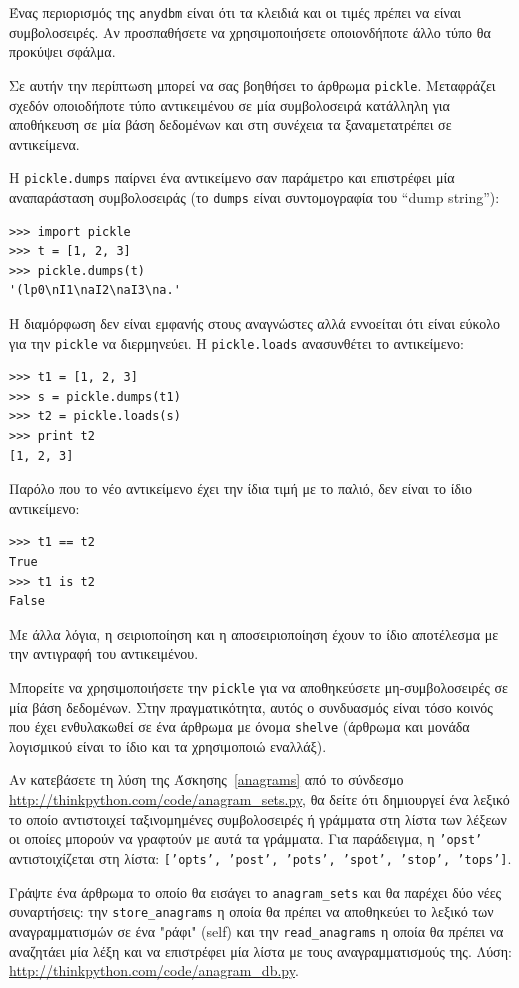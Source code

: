 \documentclass[10pt]{book}
\begin{document}
Ένας περιορισμός της {\tt anydbm} είναι ότι τα κλειδιά και οι τιμές πρέπει να είναι συμβολοσειρές. Αν προσπαθήσετε να χρησιμοποιήσετε οποιονδήποτε άλλο τύπο θα προκύψει σφάλμα.

Σε αυτήν την περίπτωση μπορεί να σας βοηθήσει το άρθρωμα  {\tt pickle}.  Μεταφράζει σχεδόν οποιοδήποτε τύπο αντικειμένου σε μία συμβολοσειρά κατάλληλη για αποθήκευση σε μία βάση δεδομένων και στη συνέχεια τα 
ξαναμετατρέπει σε αντικείμενα.

Η {\tt pickle.dumps} παίρνει ένα αντικείμενο σαν παράμετρο και επιστρέφει μία αναπαράσταση συμβολοσειράς
(το {\tt dumps} είναι συντομογραφία του ``dump string''):

\begin{verbatim}
>>> import pickle
>>> t = [1, 2, 3]
>>> pickle.dumps(t)
'(lp0\nI1\naI2\naI3\na.'
\end{verbatim}
%
Η διαμόρφωση δεν είναι εμφανής στους αναγνώστες αλλά εννοείται ότι είναι εύκολο για την {\tt pickle} να διερμηνεύει. 
Η {\tt pickle.loads} ανασυνθέτει το αντικείμενο:

\begin{verbatim}
>>> t1 = [1, 2, 3]
>>> s = pickle.dumps(t1)
>>> t2 = pickle.loads(s)
>>> print t2
[1, 2, 3]
\end{verbatim}
%
Παρόλο που το νέο αντικείμενο έχει την ίδια τιμή με το παλιό, δεν είναι το ίδιο αντικείμενο:

\begin{verbatim}
>>> t1 == t2
True
>>> t1 is t2
False
\end{verbatim}
%
Με άλλα λόγια, η σειριοποίηση και η αποσειριοποίηση έχουν το ίδιο αποτέλεσμα με την αντιγραφή του αντικειμένου.

Μπορείτε να χρησιμοποιήσετε την {\tt pickle} για να αποθηκεύσετε μη-συμβολοσειρές σε μία βάση δεδομένων. 
Στην πραγματικότητα, αυτός ο συνδυασμός είναι τόσο κοινός που έχει ενθυλακωθεί σε ένα άρθρωμα με όνομα {\tt shelve}
(άρθρωμα και μονάδα λογισμικού είναι το ίδιο και τα χρησιμοποιώ εναλλάξ).
\\


\begin{exercise}

Αν κατεβάσετε τη λύση της Άσκησης~\ref{anagrams} από το σύνδεσμο \url{http://thinkpython.com/code/anagram_sets.py}, θα δείτε ότι δημιουργεί ένα λεξικό το οποίο αντιστοιχεί ταξινομημένες συμβολοσειρές ή γράμματα στη λίστα των λέξεων οι οποίες μπορούν να γραφτούν με αυτά τα γράμματα. Για παράδειγμα, η {\tt 'opst'} αντιστοιχίζεται στη λίστα: {\tt ['opts', 'post', 'pots', 'spot', 'stop', 'tops']}.

Γράψτε ένα άρθρωμα το οποίο θα εισάγει το \verb"anagram_sets" και θα παρέχει δύο νέες συναρτήσεις: την \verb"store_anagrams" η οποία θα πρέπει να αποθηκεύει το λεξικό των αναγραμματισμών σε ένα "ράφι" (self)
και την \verb"read_anagrams" η οποία θα πρέπει να αναζητάει μία λέξη και να επιστρέφει μία λίστα με τους
αναγραμματισμούς της. Λύση: \url{http://thinkpython.com/code/anagram_db.py}. 
\end{exercise}
\end{document}
